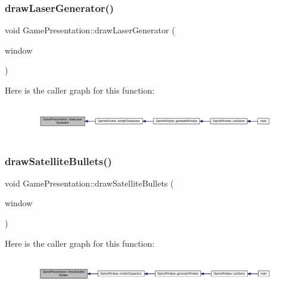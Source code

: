 \subsubsection{\texorpdfstring{draw\+Laser\+Generator()}{drawLaserGenerator()}}
{\footnotesize\ttfamily void Game\+Presentation\+::draw\+Laser\+Generator (\begin{DoxyParamCaption}\item[{Render\+Window \&}]{window }\end{DoxyParamCaption})}

Here is the caller graph for this function\+:\nopagebreak
\begin{figure}[H]
\begin{center}
\leavevmode
\includegraphics[width=350pt]{class_game_presentation_a8c0ec310f4105564f11d1b48779e3941_icgraph}
\end{center}
\end{figure}
\mbox{\label{class_game_presentation_a6ee175034a6d067f2755c75c753f07a0}} 
\subsubsection{\texorpdfstring{draw\+Satellite\+Bullets()}{drawSatelliteBullets()}}
{\footnotesize\ttfamily void Game\+Presentation\+::draw\+Satellite\+Bullets (\begin{DoxyParamCaption}\item[{Render\+Window \&}]{window }\end{DoxyParamCaption})}

Here is the caller graph for this function\+:\nopagebreak
\begin{figure}[H]
\begin{center}
\leavevmode
\includegraphics[width=350pt]{class_game_presentation_a6ee175034a6d067f2755c75c753f07a0_icgraph}
\end{center}
\end{figure}
\mbox{\label{class_game_presentation_a7a94467d53b62bd7a83035ea4fa386ac}} 
